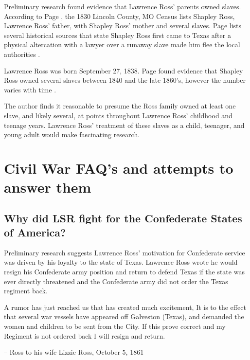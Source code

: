 \documentclass[12pt]{article}
\begin{document}
Preliminary research found evidence that Lawrence Ross' parents owned slaves. According to Page \cite[pg.49]{page}, the 1830 Lincoln County, MO Census lists Shapley Ross, Lawrence Ross' father, with Shapley Ross' mother and several slaves. Page lists several historical sources that state Shapley Ross first came to Texas after a physical altercation with a lawyer over a runaway slave made him flee the local authorities \cite[pg.50--51]{page}. 

Lawrence Ross was born September 27, 1838. Page found evidence that Shapley Ross owned several slaves between 1840 and the late 1860's, however the number varies with time \cite[pg.51--55]{page}. 

The author finds it reasonable to presume the Ross family owned at least one slave, and likely several, at points throughout Lawrence Ross' childhood and teenage years. Lawrence Ross' treatment of these slaves as a child, teenager, and young adult would make fascinating research. 

\newpage
\section{Civil War FAQ's and attempts to answer them}

\subsection{Why did LSR fight for the Confederate States of America?}
Preliminary research suggests Lawrence Ross' motivation for Confederate service was driven by his loyalty to the state of Texas. Lawrence Ross wrote he would resign his Confederate army position and return to defend Texas if the state was ever directly threatened and the Confederate army did not order the Texas regiment back. 
\begin{displayquote}
A rumor has just reached us that has created much excitement, It is to the effect that several war vessels have appeared off Galveston (Texas), and demanded the women and children to be sent from the City. If this prove correct and my Regiment is not ordered back I will resign and return. 

-- Ross to his wife Lizzie Ross, October 5, 1861 \cite[pg. 9]{sullyletters}
\end{displayquote}
\end{document}
